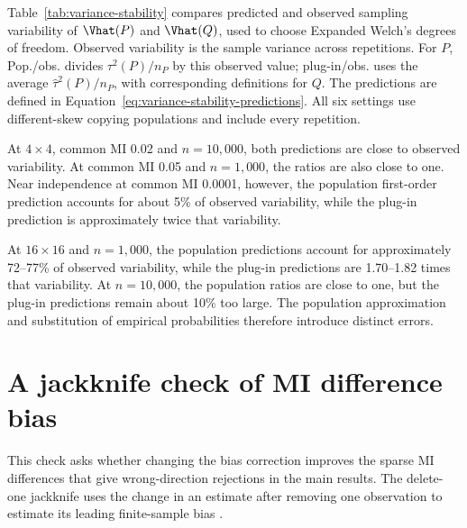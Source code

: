 \begin{table}[H]
\centering
\small
\caption{Different-skew null diagnostics at \(n=50{,}000\).}
\label{tab:large-sample-diagnostics}

\end{table}

\medskip
{}

Table~\ref{tab:variance-stability} compares predicted and observed sampling
variability of \(\Vhat(P)\) and \(\Vhat(Q)\), used to choose Expanded
Welch's degrees of freedom. Observed variability is the sample variance
across repetitions. For \(P\), Pop./obs. divides \(\tau^2(P)/n_P\)
by this observed value; plug-in/obs. uses the average
\(\widehat\tau^2(P)/n_P\), with corresponding definitions for \(Q\).
The predictions are defined in
Equation~\eqref{eq:variance-stability-predictions}. All six settings use
different-skew copying populations and include every repetition.

\begin{table}[H]
\centering
\small
\caption{Predicted and observed variability of the estimated MI variance.}
\label{tab:variance-stability}

\end{table}

At \(4\times4\), common MI 0.02 and \(n=10{,}000\), both
predictions are close to observed variability. At common MI 0.05 and
\(n=1{,}000\), the ratios are also close to one. Near independence
at common MI 0.0001, however, the population first-order prediction
accounts for about 5\% of observed variability, while the plug-in
prediction is approximately twice that variability.

At \(16\times16\) and \(n=1{,}000\), the population predictions account for approximately
72--77\% of observed variability, while the plug-in predictions are
1.70--1.82 times that variability. At \(n=10{,}000\), the population
ratios are close to one, but the plug-in predictions remain about 10\%
too large. The population approximation and substitution of empirical
probabilities therefore introduce distinct errors.

\section{A jackknife check of MI difference bias}
\label{sec:jackknife-difference-check}

This check asks whether changing the bias correction improves the sparse
MI differences that give wrong-direction rejections in the main results.
The delete-one jackknife uses the change in an estimate after removing
one observation to estimate its leading finite-sample bias
\citep[Section~3]{paninski2003}.

